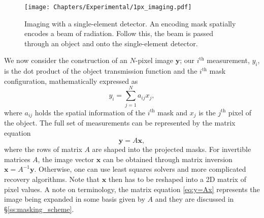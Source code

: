 \begin{figure}[h!]\centering
\texttt{[image: Chapters/Experimental/1px\_imaging.pdf]}
\caption{Imaging with a single-element detector. An encoding mask spatially encodes a beam of radiation. Follow this, the beam is passed through an object and onto the single-element detector.}
\label{fig:1px_imaging}
\end{figure}



We now consider the construction of an $N$-pixel image $\mathbf{y}$; our $i^{\text{th}}$ measurement, $y_i$, is the dot product of the object transmission function and the $i^{\text{th}}$ mask configuration, mathematically expressed as 
\begin{equation}
y_i=\sum_{j=1}^N a_{ij}x_j,
\label{eq:phi_i}
\end{equation}
where $a_{ij}$ holds the spatial information of the $i^{\text{th}}$ mask and $x_j$ is the $j^{\text{th}}$ pixel of the object. The full set of measurements can be represented by the matrix equation 
\begin{equation}
\mathbf{y}=A\mathbf{x},
\label{eq:y=Ax}
\end{equation}
where the rows of matrix $A$ are shaped into the projected masks. For invertible matrices $A$, the image vector $\mathbf{x}$ can be obtained through matrix inversion $\mathbf{x}=A^{-1}\mathbf{y}$. Otherwise, one can use least squares solvers and more complicated recovery algorithms. Note that $\mathbf{x}$ then has to be reshaped into a 2D matrix of pixel values. A note on terminology, the matrix equation \eqref{eq:y=Ax} represents the image being expanded in some basis given by $A$ and they are discussed in \S\ref{ss:masking_scheme}. 


